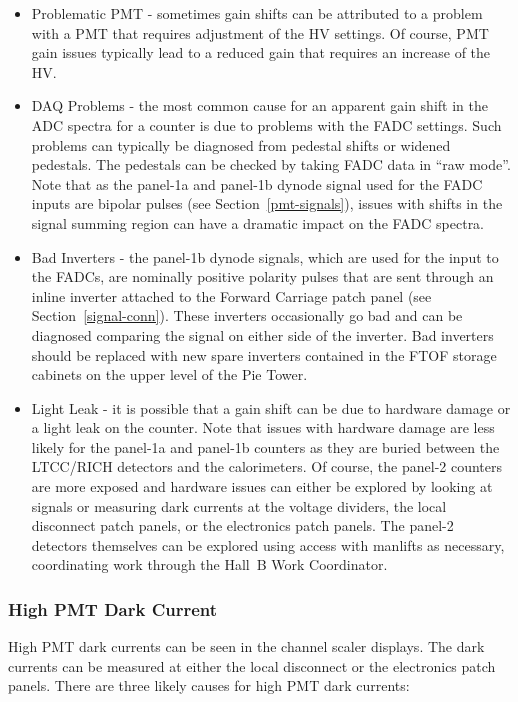 \documentclass[12pt]{article}
\begin{document}
\begin{itemize}
\item Problematic PMT - sometimes gain shifts can be attributed to a problem with a PMT that requires 
adjustment of the HV settings. Of course, PMT gain issues typically lead to a reduced gain that requires 
an increase of the HV. 
\item DAQ Problems - the most common cause for an apparent gain shift in the ADC spectra for a counter 
is due to problems with the FADC settings. Such problems can typically be diagnosed from pedestal shifts 
or widened pedestals. The pedestals can be checked by taking FADC data in ``raw mode''. Note that as 
the panel-1a and panel-1b dynode signal used for the FADC inputs are bipolar pulses (see 
Section~\ref{pmt-signals}), issues with shifts in the signal summing region can have a dramatic impact 
on the FADC spectra. 
\item Bad Inverters - the panel-1b dynode signals, which are used for the input to the FADCs, are 
nominally positive polarity pulses that are sent through an inline inverter attached to the Forward 
Carriage patch panel (see Section~\ref{signal-conn}). These inverters occasionally go bad and can be 
diagnosed comparing the signal on either side of the inverter. Bad inverters should be replaced with 
new spare inverters contained in the FTOF storage cabinets on the upper level of the Pie Tower.
\item Light Leak - it is possible that a gain shift can be due to hardware damage or a light leak on the 
counter. Note that issues with hardware damage are less likely for the panel-1a and panel-1b counters as 
they are buried between the LTCC/RICH detectors and the calorimeters. Of course, the panel-2 counters are 
more exposed and hardware issues can either be explored by looking at signals or measuring dark currents 
at the voltage dividers, the local disconnect patch panels, or the electronics patch panels. The panel-2 
detectors themselves can be explored using access with manlifts as necessary, coordinating work through 
the Hall~B Work Coordinator.
\end{itemize}

\subsubsection{High PMT Dark Current}
\label{high-current}

High PMT dark currents can be seen in the channel scaler displays. The dark currents can be measured
at either the local disconnect or the electronics patch panels. There are three likely causes for high 
PMT dark currents:
\end{document}
